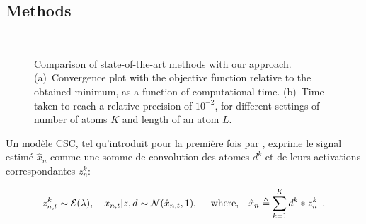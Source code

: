 \subsection*{Methods}

\begin{figure}[htb]
    \centering
      \\
    \caption[]{Comparison of state-of-the-art methods with our approach. (a)~Convergence plot with the objective function relative to the obtained minimum, as a function of computational time. (b)~Time taken to reach a relative precision of $10^{-2}$, for different settings of number of atoms $K$ and length of an atom $L$.  }
    \label{fig:sommaire:convergence}
\end{figure}

Un modèle CSC, tel qu'introduit pour la première fois par \citet{grosse2012shift}, exprime le signal estimé $\hat{x}_n$ comme une somme de convolution des atomes $d^k$  et de leurs activations correspondantes $z_n^k$:

\begin{align}
z_{n,t}^k \sim {\cal E}(\lambda),
\quad x_{n,t} | z, d \sim {\cal N}( \hat{x}_{n,t},1 ),
\quad \text{ where,}
\quad \hat{x}_n \triangleq \sum_{k=1}^{K}d^{k} * z_{n}^{k} \enspace .
\label{eqn:sommaire:csc_prob}
\end{align}

